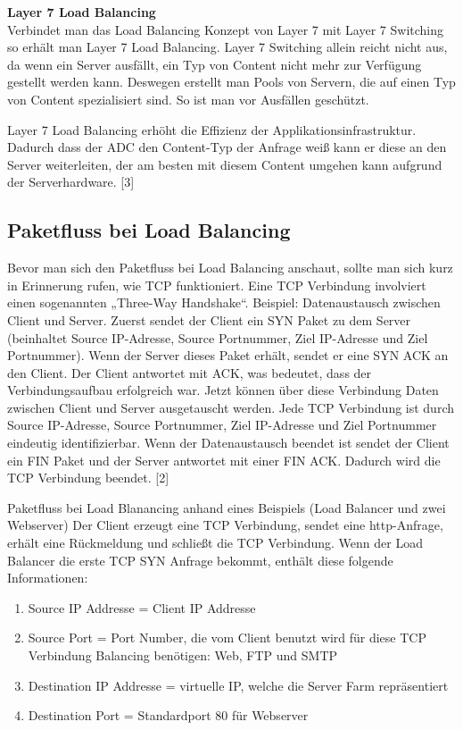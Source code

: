 \textbf{Layer 7 Load Balancing} \\
Verbindet man das Load Balancing Konzept von Layer 7 mit Layer 7 Switching so erhält man Layer 7 Load Balancing. Layer 7 Switching allein reicht nicht aus, da wenn ein Server ausfällt, ein Typ von Content nicht mehr zur Verfügung gestellt werden kann. Deswegen erstellt man Pools von Servern, die auf einen Typ von Content spezialisiert sind. So ist man vor Ausfällen geschützt. 

Layer 7 Load Balancing erhöht die Effizienz der Applikationsinfrastruktur. Dadurch dass der ADC den Content-Typ der Anfrage weiß kann er diese an den Server weiterleiten, der am besten mit diesem Content umgehen kann aufgrund der Serverhardware. [3]

\subsection{Paketfluss bei Load Balancing}
\label{sec:Paketfluss bei Load Balancing}

Bevor man sich den Paketfluss bei Load Balancing anschaut, sollte man sich kurz in Erinnerung rufen, wie TCP funktioniert. Eine TCP Verbindung involviert einen sogenannten „Three-Way Handshake“. Beispiel: Datenaustausch zwischen Client und Server. Zuerst sendet der Client ein SYN Paket zu dem Server (beinhaltet Source IP-Adresse, Source Portnummer, Ziel IP-Adresse und Ziel Portnummer). Wenn der Server dieses Paket erhält, sendet er eine SYN ACK an den Client. Der Client antwortet mit ACK, was bedeutet, dass der Verbindungsaufbau erfolgreich war. Jetzt können über diese Verbindung Daten zwischen Client und  Server ausgetauscht werden. Jede TCP Verbindung ist durch Source IP-Adresse, Source Portnummer, Ziel IP-Adresse und Ziel Portnummer eindeutig identifizierbar. Wenn der Datenaustausch beendet ist sendet der Client ein FIN Paket und der Server antwortet mit einer FIN ACK. Dadurch wird die TCP Verbindung beendet. [2]

Paketfluss bei Load Blanancing anhand eines Beispiels (Load Balancer und zwei Webserver)
Der Client erzeugt eine TCP Verbindung, sendet eine http-Anfrage, erhält eine Rückmeldung und schließt die TCP Verbindung. Wenn der Load Balancer die erste TCP SYN Anfrage bekommt, enthält diese folgende Informationen:
\begin{enumerate}
\item Source IP Addresse = Client IP Addresse
\item Source Port = Port Number, die vom Client benutzt wird für diese TCP Verbindung Balancing benötigen: Web, FTP und SMTP
\item Destination IP Addresse = virtuelle IP, welche die Server Farm repräsentiert
\item Destination Port = Standardport 80 für Webserver
\end{enumerate}

